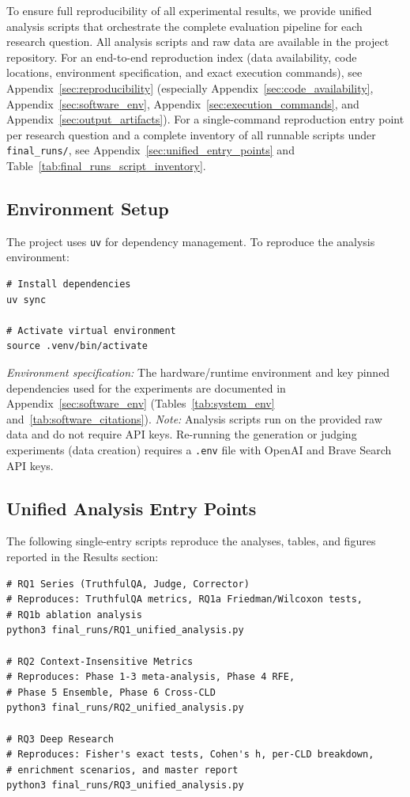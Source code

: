 To ensure full reproducibility of all experimental results, we provide unified analysis scripts that orchestrate the complete evaluation pipeline for each research question. All analysis scripts and raw data are available in the project repository.
For an end-to-end reproduction index (data availability, code locations, environment specification, and exact execution commands), see Appendix~\ref{sec:reproducibility} (especially Appendix~\ref{sec:code_availability}, Appendix~\ref{sec:software_env}, Appendix~\ref{sec:execution_commands}, and Appendix~\ref{sec:output_artifacts}).
For a single-command reproduction entry point per research question and a complete inventory of all runnable scripts under \texttt{final\_runs/}, see Appendix~\ref{sec:unified_entry_points} and Table~\ref{tab:final_runs_script_inventory}.

\subsection{Environment Setup}
The project uses \texttt{uv} for dependency management. To reproduce the analysis environment:
\begin{verbatim}
# Install dependencies
uv sync

# Activate virtual environment
source .venv/bin/activate
\end{verbatim}
\textit{Environment specification:} The hardware/runtime environment and key pinned dependencies used for the experiments are documented in Appendix~\ref{sec:software_env} (Tables~\ref{tab:system_env} and~\ref{tab:software_citations}).
\textit{Note:} Analysis scripts run on the provided raw data and do not require API keys. Re-running the generation or judging experiments (data creation) requires a \texttt{.env} file with OpenAI and Brave Search API keys.

\subsection{Unified Analysis Entry Points}
The following single-entry scripts reproduce the analyses, tables, and figures reported in the Results section:

\begin{verbatim}
# RQ1 Series (TruthfulQA, Judge, Corrector)
# Reproduces: TruthfulQA metrics, RQ1a Friedman/Wilcoxon tests,
# RQ1b ablation analysis
python3 final_runs/RQ1_unified_analysis.py

# RQ2 Context-Insensitive Metrics
# Reproduces: Phase 1-3 meta-analysis, Phase 4 RFE,
# Phase 5 Ensemble, Phase 6 Cross-CLD
python3 final_runs/RQ2_unified_analysis.py

# RQ3 Deep Research
# Reproduces: Fisher's exact tests, Cohen's h, per-CLD breakdown,
# enrichment scenarios, and master report
python3 final_runs/RQ3_unified_analysis.py
\end{verbatim}

